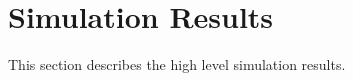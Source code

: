 \section{Simulation Results} \label{sec:simulation_results}
This section describes the high level simulation results. 

